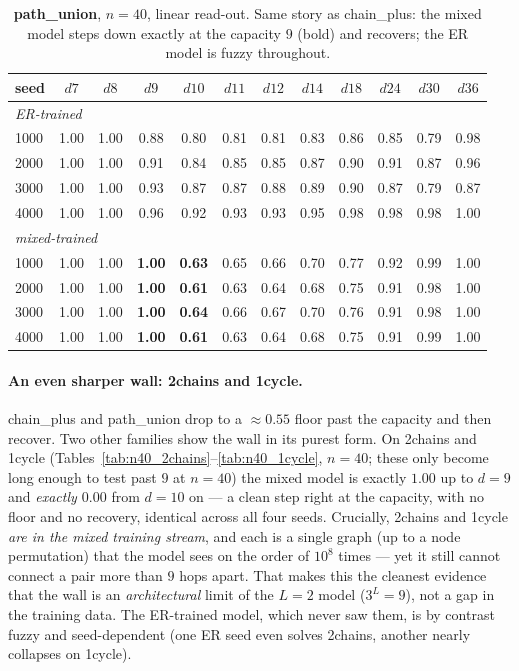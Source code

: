\documentclass[11pt,a4paper]{article}
\begin{document}
\begin{table}[H]\centering\small
\begin{tabular}{lccccccccccc}
\toprule
seed & $d7$ & $d8$ & $d9$ & $d10$ & $d11$ & $d12$ & $d14$ & $d18$ & $d24$ & $d30$ & $d36$ \\
\midrule
\multicolumn{12}{l}{\emph{ER-trained}}\\
1000 & 1.00 & 1.00 & 0.88 & 0.80 & 0.81 & 0.81 & 0.83 & 0.86 & 0.85 & 0.79 & 0.98 \\
2000 & 1.00 & 1.00 & 0.91 & 0.84 & 0.85 & 0.85 & 0.87 & 0.90 & 0.91 & 0.87 & 0.96 \\
3000 & 1.00 & 1.00 & 0.93 & 0.87 & 0.87 & 0.88 & 0.89 & 0.90 & 0.87 & 0.79 & 0.87 \\
4000 & 1.00 & 1.00 & 0.96 & 0.92 & 0.93 & 0.93 & 0.95 & 0.98 & 0.98 & 0.98 & 1.00 \\
\midrule
\multicolumn{12}{l}{\emph{mixed-trained}}\\
1000 & 1.00 & 1.00 & \textbf{1.00} & \textbf{0.63} & 0.65 & 0.66 & 0.70 & 0.77 & 0.92 & 0.99 & 1.00 \\
2000 & 1.00 & 1.00 & \textbf{1.00} & \textbf{0.61} & 0.63 & 0.64 & 0.68 & 0.75 & 0.91 & 0.98 & 1.00 \\
3000 & 1.00 & 1.00 & \textbf{1.00} & \textbf{0.64} & 0.66 & 0.67 & 0.70 & 0.76 & 0.91 & 0.98 & 1.00 \\
4000 & 1.00 & 1.00 & \textbf{1.00} & \textbf{0.61} & 0.63 & 0.64 & 0.68 & 0.75 & 0.91 & 0.99 & 1.00 \\
\bottomrule\end{tabular}
\caption{\textbf{path\_union}, $n=40$, linear read-out. Same story as chain\_plus: the mixed model steps down
exactly at the capacity $9$ (bold) and recovers; the ER model is fuzzy throughout.}
\label{tab:n40_path_union}
\end{table}

\paragraph{An even sharper wall: 2chains and 1cycle.} chain\_plus and path\_union drop to a
$\approx0.55$ floor past the capacity and then recover. Two other families show the wall in its
purest form. On 2chains and 1cycle (Tables~\ref{tab:n40_2chains}--\ref{tab:n40_1cycle}, $n=40$;
these only become long enough to test past $9$ at $n=40$) the mixed model is exactly $1.00$ up
to $d=9$ and \emph{exactly $0.00$} from $d=10$ on --- a clean step right at the capacity, with no
floor and no recovery, identical across all four seeds. Crucially,
2chains and 1cycle \emph{are in the mixed training stream}, and each is a single graph (up to a
node permutation) that the model sees on the order of $10^8$ times --- yet it still cannot
connect a pair more than $9$ hops apart. That makes this the cleanest evidence that the wall is
an \emph{architectural} limit of the $L=2$ model ($3^L=9$), not a gap in the training data. The
ER-trained model, which never saw them, is by contrast fuzzy and seed-dependent (one ER seed even
solves 2chains, another nearly collapses on 1cycle).
\end{document}
